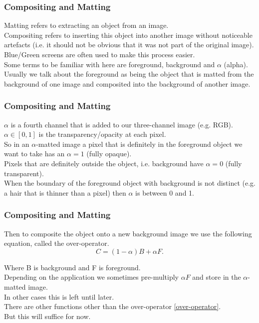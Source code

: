 \begin{frame}\frametitle{Compositing and Matting}
Matting refers to extracting an object from an image.\\
Compositing refers to inserting this object into another image without noticeable artefacts (i.e. it should not be obvious that it was not part of the original image). \\
Blue/Green screens are often used to make this process easier.\\
Some terms to be familiar with here are foreground, background and $\alpha$ (alpha).\\
Usually we talk about the foreground as being the object that is matted from the background of one image and composited into the background of another image.
\end{frame}
\begin{frame}\frametitle{Compositing and Matting}
$\alpha$ is a fourth channel that is added to our three-channel image (e.g. RGB). $\alpha \in [0,1]$ is the transparency/opacity at each pixel.\\ So in an $\alpha$-matted image a pixel that is definitely in the foreground object we want to take has an $\alpha=1$ (fully opaque). \\Pixels that are definitely outside the object, i.e. background have $\alpha=0$ (fully transparent). \\When the boundary of the foreground object with background is not distinct (e.g. a hair that is thinner than a pixel) then $\alpha$ is between 0 and 1.\\
\end{frame}
\begin{frame}\frametitle{Compositing and Matting}
Then to composite the object onto a new background image we use the following equation, called the over-operator.
\begin{equation}
    C = (1-\alpha)B + \alpha F.
    \label{over-operator}
\end{equation}

Where B is background and F is foreground. \\Depending on the application we sometimes pre-multiply $\alpha F$ and store in the $\alpha$-matted image.\\ In other cases this is left until later.\\
There are other functions other than the over-operator \eqref{over-operator}.\\ But this will suffice for now.
\end{frame}

